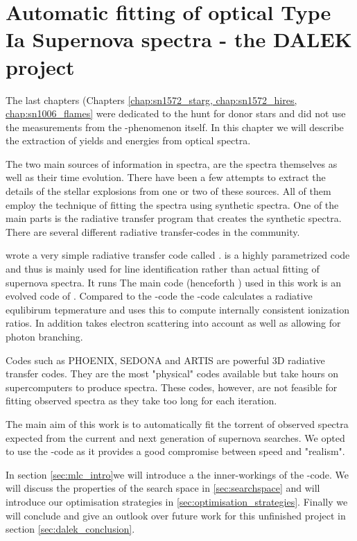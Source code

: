 \chapter{Automatic fitting of optical Type Ia Supernova spectra - the DALEK project}
\label{chap:dalek}

The last chapters (Chapters \ref{chap:sn1572_starg, chap:sn1572_hires, chap:sn1006_flames} were dedicated to the hunt for donor stars and did not use the measurements from the \snia-phenomenon itself. In this chapter we will describe the extraction of yields and energies from optical spectra. 

The two main sources of information in spectra, are the spectra themselves as well as their time evolution. There have been a few attempts to extract the details of the stellar explosions from one or two of these sources. All of them employ the technique of fitting the spectra using synthetic spectra. One of the main parts is the radiative transfer program that creates the synthetic spectra. There are several different radiative transfer-codes in the community. 


\cite{2000PhDT.........6F} wrote a very simple radiative transfer code called \synow. \synow is a highly parametrized code and thus is mainly used for line identification rather than actual fitting of supernova spectra. It runs 
The main code (henceforth \mlc) used in this work is an evolved code of  \cite{1993A&A...279..447M, 2000A&A...363..705M}. Compared to the \synow-code the \mlc-code calculates a radiative equlibirum tepmerature and uses this to compute internally consistent ionization ratios. In addition \mlc takes electron scattering into account as well as allowing for photon branching. 


Codes such as PHOENIX\cite{1999JCoAM.109...41H}, SEDONA \cite{2006ApJ...651..366K} and ARTIS \cite{2009MNRAS.398.1809K} are powerful 3D radiative transfer codes. They are the most "physical" codes available but take hours on supercomputers to produce spectra. These codes, however, are not feasible for fitting observed spectra as they take too long for each iteration. 

The main aim of this work is to automatically fit the torrent of observed spectra expected from the current and next generation of supernova searches. We opted to use the \mlc-code as it provides a good compromise between speed and "realism".

In section \ref{sec:mlc_intro}we will introduce a the inner-workings of the \mlc-code.  We will discuss the properties of the search space in \ref{sec:searchspace} and will introduce our optimisation strategies in \ref{sec:optimisation_strategies}. Finally we will conclude and give an outlook over future work for this unfinished project in section \ref{sec:dalek_conclusion}.

